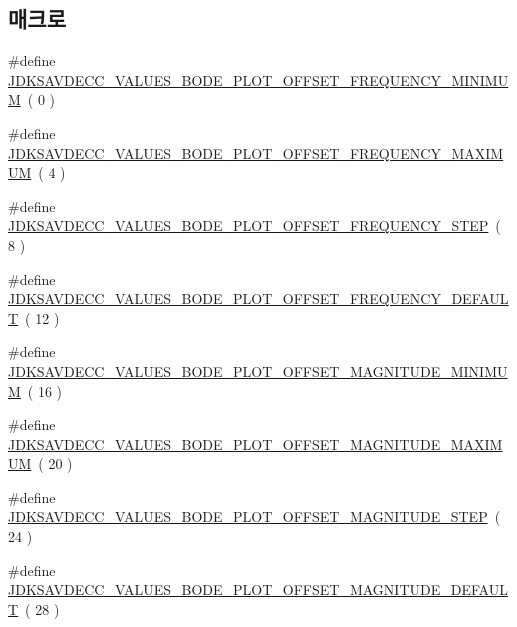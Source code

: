 \subsection*{매크로}
\begin{DoxyCompactItemize}
\item 
\#define \hyperlink{group__values__bode__plot_ga5ec323456d80f4214f29df0fa9a24a4d}{J\+D\+K\+S\+A\+V\+D\+E\+C\+C\+\_\+\+V\+A\+L\+U\+E\+S\+\_\+\+B\+O\+D\+E\+\_\+\+P\+L\+O\+T\+\_\+\+O\+F\+F\+S\+E\+T\+\_\+\+F\+R\+E\+Q\+U\+E\+N\+C\+Y\+\_\+\+M\+I\+N\+I\+M\+UM}~( 0 )
\item 
\#define \hyperlink{group__values__bode__plot_ga76f7a9b67510a9851d872236bdfd4316}{J\+D\+K\+S\+A\+V\+D\+E\+C\+C\+\_\+\+V\+A\+L\+U\+E\+S\+\_\+\+B\+O\+D\+E\+\_\+\+P\+L\+O\+T\+\_\+\+O\+F\+F\+S\+E\+T\+\_\+\+F\+R\+E\+Q\+U\+E\+N\+C\+Y\+\_\+\+M\+A\+X\+I\+M\+UM}~( 4 )
\item 
\#define \hyperlink{group__values__bode__plot_ga120aa390935ea7320a3f8e72108579d9}{J\+D\+K\+S\+A\+V\+D\+E\+C\+C\+\_\+\+V\+A\+L\+U\+E\+S\+\_\+\+B\+O\+D\+E\+\_\+\+P\+L\+O\+T\+\_\+\+O\+F\+F\+S\+E\+T\+\_\+\+F\+R\+E\+Q\+U\+E\+N\+C\+Y\+\_\+\+S\+T\+EP}~( 8 )
\item 
\#define \hyperlink{group__values__bode__plot_ga77bb61b01cddd727c68d2352ac3aa9a7}{J\+D\+K\+S\+A\+V\+D\+E\+C\+C\+\_\+\+V\+A\+L\+U\+E\+S\+\_\+\+B\+O\+D\+E\+\_\+\+P\+L\+O\+T\+\_\+\+O\+F\+F\+S\+E\+T\+\_\+\+F\+R\+E\+Q\+U\+E\+N\+C\+Y\+\_\+\+D\+E\+F\+A\+U\+LT}~( 12 )
\item 
\#define \hyperlink{group__values__bode__plot_ga2989129caca431f3046063a15880f54e}{J\+D\+K\+S\+A\+V\+D\+E\+C\+C\+\_\+\+V\+A\+L\+U\+E\+S\+\_\+\+B\+O\+D\+E\+\_\+\+P\+L\+O\+T\+\_\+\+O\+F\+F\+S\+E\+T\+\_\+\+M\+A\+G\+N\+I\+T\+U\+D\+E\+\_\+\+M\+I\+N\+I\+M\+UM}~( 16 )
\item 
\#define \hyperlink{group__values__bode__plot_ga71bf0bf4f49fa7cf70df100a163ca2d2}{J\+D\+K\+S\+A\+V\+D\+E\+C\+C\+\_\+\+V\+A\+L\+U\+E\+S\+\_\+\+B\+O\+D\+E\+\_\+\+P\+L\+O\+T\+\_\+\+O\+F\+F\+S\+E\+T\+\_\+\+M\+A\+G\+N\+I\+T\+U\+D\+E\+\_\+\+M\+A\+X\+I\+M\+UM}~( 20 )
\item 
\#define \hyperlink{group__values__bode__plot_gad33d13de1d413f49441b1a5eb3270b76}{J\+D\+K\+S\+A\+V\+D\+E\+C\+C\+\_\+\+V\+A\+L\+U\+E\+S\+\_\+\+B\+O\+D\+E\+\_\+\+P\+L\+O\+T\+\_\+\+O\+F\+F\+S\+E\+T\+\_\+\+M\+A\+G\+N\+I\+T\+U\+D\+E\+\_\+\+S\+T\+EP}~( 24 )
\item 
\#define \hyperlink{group__values__bode__plot_ga071fe0b87c20377a42ea5bdf53ec2e35}{J\+D\+K\+S\+A\+V\+D\+E\+C\+C\+\_\+\+V\+A\+L\+U\+E\+S\+\_\+\+B\+O\+D\+E\+\_\+\+P\+L\+O\+T\+\_\+\+O\+F\+F\+S\+E\+T\+\_\+\+M\+A\+G\+N\+I\+T\+U\+D\+E\+\_\+\+D\+E\+F\+A\+U\+LT}~( 28 )

\end{DoxyCompactItemize}
